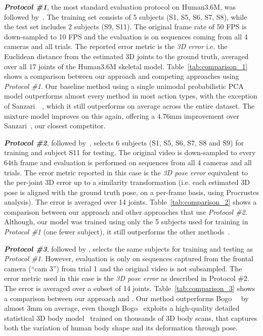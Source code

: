 \documentclass[10pt,twocolumn,letterpaper]{article}
\begin{document}
\textit{{\bf Protocol \#1}}, the most standard evaluation protocol on Human3.6M,
was followed by~\cite{ionescu2014human3, li2015maximum, tekin2015predicting,
  tekin2016structured, tekin2016fusing, zhou2015sparseness,
  sanzari2016bayesian}. The training set consists of 5 subjects (S1, S5, S6, S7,
S8), while the test set includes 2 subjects (S9, S11). The original frame rate
of 50 FPS is down-sampled to 10 FPS and the evaluation is on sequences coming
from all 4 cameras and all trials. The reported error metric is the \emph{3D
  error} i.e. the Euclidean distance from the estimated 3D joints to the ground
truth, averaged over all 17 joints of the Human3.6M skeletal model.
Table~\ref{tab:comparison_1} shows a comparison between our approach and
competing approaches using \textit{Protocol \#1}.
Our baseline method using a single unimodal probabilistic PCA model outperforms
almost every method in most action types, with the exception of
Sanzari~\etal~\cite{sanzari2016bayesian}, which it still outperforms on average
across the entire dataset. The mixture model improves on this again, offering a
$4.76$mm improvement over Sanzari~\etal, our closest competitor.

\textit{{\bf Protocol \#2}}, followed
by~\cite{Yasin:etal:CVPR:2016,rogez2016mocap}, selects 6 subjects (S1, S5, S6,
S7, S8 and S9) for training and subject S11 for testing. The original video is
down-sampled to every 64th frame and evaluation is performed on sequences from
all 4 cameras and all trials. The error metric reported in this case is
the \emph{3D pose error} equivalent to the per-joint 3D error up to a similarity
transformation (i.e. each estimated 3D pose is aligned with the ground truth
pose, on a per-frame basis, using Procrustes analysis). The error is averaged
over 14 joints.  Table~\ref{tab:comparison_2} shows a comparison between our
approach and other approaches that use \textit{Protocol \#2}. Although, our
model was trained using only the 5 subjects used for training in \emph{Protocol
  \#1} (one fewer subject), it still outperforms the other
methods~\cite{rogez2016mocap,Yasin:etal:CVPR:2016}.

\textit{{\bf Protocol \#3}}, followed by \cite{bogo2016keep}, selects the same
subjects for training and testing as \emph{Protocol \#1}. However, evaluation is
only on sequences captured from the frontal camera (``cam 3'') from trial 1 and
the original video is not subsampled. The error metric used in this case is the \emph{3D
  pose error} as described in Protocol \#2. The error is averaged over a subset
of 14 joints. Table~\ref{tab:comparison_3} shows a comparison between our
approach and \cite{bogo2016keep}. Our method outperforms
Bogo~\etal~\cite{bogo2016keep} by almost 3mm on average, even though Bogo~\etal
exploits a high-quality detailed statistical 3D body model~\cite{loper2015smpl}
trained on thousands of 3D body scans, that captures both the variation of human
body shape and its deformation through pose.
\end{document}
